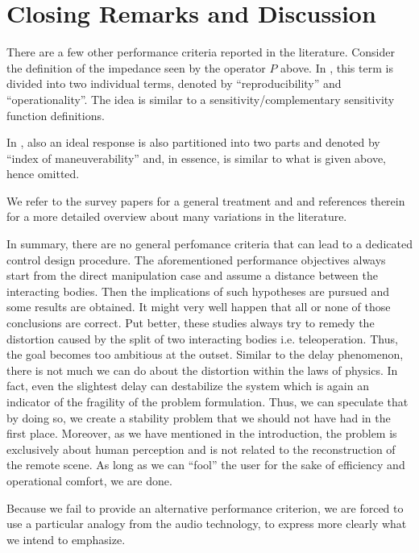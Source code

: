 \section{Closing Remarks and Discussion}
There are a few other performance criteria reported in the literature. Consider the definition of the impedance seen by 
the operator $P$ above. In \cite{iida,katsura}, this term is divided into two individual terms, denoted by 
\enquote{reproducibility} and \enquote{operationality}. The idea is similar to a sensitivity/complementary sensitivity 
function definitions. 

In \cite{yokokohjiyoshikawa}, also an ideal response is also partitioned into two parts and denoted by \enquote{index of 
maneuverability} and, in essence, is similar to what is given above, hence omitted. 

We refer to the survey papers \cite{hokayemspong,passenberg} for a general treatment and \cite{klomp,dennis} and references 
therein for a more detailed overview about many variations in the literature.


In summary, there are no general perfomance criteria that can lead to a dedicated control design procedure. The aforementioned 
performance objectives always start from the direct manipulation case and assume a distance between the interacting bodies.
Then the implications of such hypotheses are pursued and some results are obtained. It might very well happen that all or none 
of those conclusions are correct. Put better, these studies always try to remedy the distortion caused by the split of two 
interacting bodies i.e. teleoperation. Thus, the goal becomes too ambitious at the outset. Similar to the delay phenomenon, 
there is not much we can do about the distortion within the laws of physics. In fact, even the slightest delay can destabilize 
the system which is again an indicator of the fragility of the problem formulation. 
Thus, we can speculate that by doing so, we create a stability problem that we should not have had in the first place. Moreover, 
as we have mentioned in the introduction, the problem is exclusively about human perception and is not related to the reconstruction 
of the remote scene. As long as we can \enquote{fool} the user for the sake of efficiency and operational comfort, we are done. 

Because we fail to provide an alternative performance criterion, we are forced to use a particular analogy from the audio
technology, to express more clearly what we intend to emphasize. 

